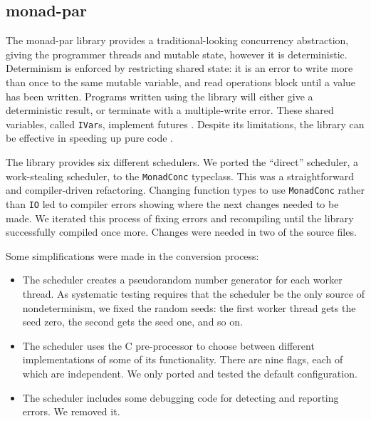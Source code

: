 \FloatBarrier

\subsection{monad-par}
\label{sec:dejafu-casestudies-par}

The monad-par library \parencite{monad_par,marlow2011} provides a
traditional-looking concurrency abstraction, giving the programmer
threads and mutable state, however it is deterministic.  Determinism
is enforced by restricting shared state: it is an error to write more
than once to the same mutable variable, and read operations block
until a value has been written.  Programs written using the library
will either give a deterministic result, or terminate with a
multiple-write error.  These shared variables, called \verb|IVar|s,
implement futures \parencite{marlow2011}.  Despite its limitations, the
library can be effective in speeding up pure code \parencite{marlow2011}.

The library provides six different schedulers.  We ported the
``direct'' scheduler, a work-stealing scheduler, to the
\verb|MonadConc| typeclass.  This was a straightforward and
compiler-driven refactoring.  Changing function types to use
\verb|MonadConc| rather than \verb|IO| led to compiler errors showing
where the next changes needed to be made.  We iterated this process of
fixing errors and recompiling until the library successfully compiled
once more.  Changes were needed in two of the source files.

Some simplifications were made in the conversion process:

\begin{itemize}
\item The scheduler creates a pseudorandom number generator for each
  worker thread.  As systematic testing requires that the scheduler be
  the only source of nondeterminism, we fixed the random seeds: the
  first worker thread gets the seed zero, the second gets the seed
  one, and so on.
\item The scheduler uses the C pre-processor to choose between
  different implementations of some of its functionality.  There are
  nine flags, each of which are independent.  We only ported and
  tested the default configuration.
\item The scheduler includes some debugging code for detecting and
  reporting errors.  We removed it.
\end{itemize}

